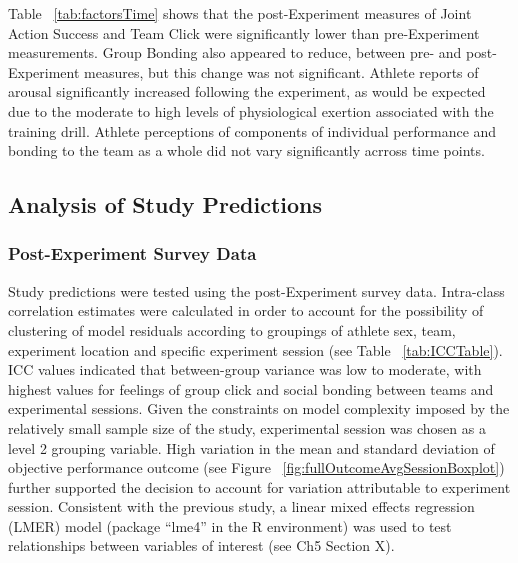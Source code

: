 \documentclass[english]{article}\usepackage[]{graphicx}\usepackage[]{color}
\begin{document}
Table ~\ref{tab:factorsTime} shows that the post-Experiment measures of Joint Action Success and Team Click were significantly lower than pre-Experiment measurements.  Group Bonding also appeared to reduce, between pre- and post-Experiment measures,  but this change was not significant.  Athlete reports of arousal significantly increased following the experiment, as would be expected due to the moderate to high levels of physiological exertion associated with the training drill.  Athlete perceptions of components of individual performance and bonding to the team as a whole did not vary significantly acrross time points.



















\subsection{Analysis of Study Predictions}



\subsubsection{Post-Experiment Survey Data}

Study predictions were tested using the post-Experiment survey data.  Intra-class correlation estimates were calculated in order to account for the possibility of clustering of model residuals according to groupings of athlete sex, team, experiment location and specific experiment session (see Table ~\ref{tab:ICCTable}). ICC values indicated that between-group variance was low to moderate, with highest values for feelings of group click and social bonding between teams and experimental sessions. Given the constraints on model complexity imposed by the relatively small sample size of the study, experimental session was chosen as a level 2 grouping variable. High variation in the mean and standard deviation of objective performance outcome (see Figure ~\ref{fig:fullOutcomeAvgSessionBoxplot}) further supported the decision to account for variation attributable to experiment session. Consistent with the previous study, a linear mixed effects regression (LMER) model (package ``lme4'' in the R environment) was used to test relationships between variables of interest (see Ch5 Section X).
\end{document}
